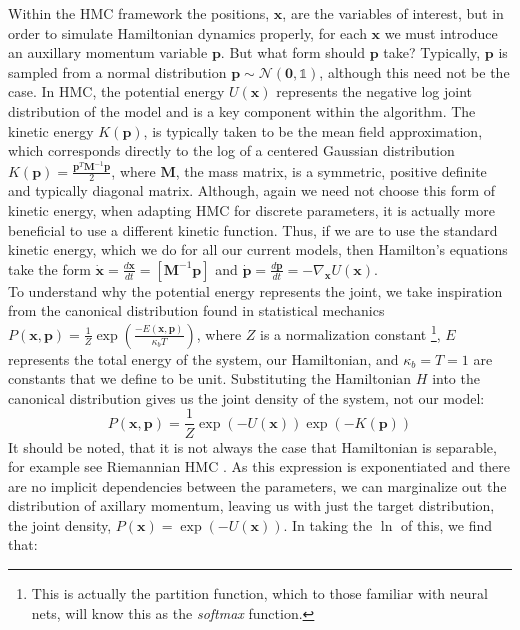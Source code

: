 Within the HMC framework the positions, $\textbf{x}$, are the variables of interest, but in order to simulate Hamiltonian dynamics properly, for each $\textbf{x}$ we must introduce an auxillary momentum variable $\textbf{p}$. But what form should $\textbf{p}$ take? Typically, $\textbf{p}$ is sampled from a normal distribution $\textbf{p} \sim \mathcal{N}(\textbf{0}, \mathds{1})$, although this need not be the case. In HMC, the potential energy $U(\textbf{x})$ represents the negative log joint distribution of the model and is a key component within the algorithm.  The kinetic energy $K(\textbf{p})$, is typically taken to be the mean field approximation, which corresponds directly to the log of a centered Gaussian distribution $K(\textbf{p}) = \frac{\textbf{p}^{T} \textbf{M}^{-1} \textbf{p}}{2}$, where $\textbf{M}$, the mass matrix, is a symmetric, positive definite and typically diagonal matrix. Although, again we need not choose this form of kinetic energy, when adapting HMC for discrete parameters, it is actually more beneficial to use a different kinetic function\citep{nishimura2017discontinuous}. Thus, if we are to use the standard kinetic energy, which we do for all our current models, then Hamilton's equations take the form $
\dot{\textbf{x}} = \frac{d\textbf{x}}{dt} = [\textbf{M}^{-1}\textbf{p}]$ and $ \dot{\textbf{p}} = \frac{d\textbf{p}}{dt} = -\nabla_{\textbf{x}}U(\textbf{x})$.\\
To understand why the potential energy represents the joint, we take inspiration from the canonical distribution found in statistical mechanics
$P(\textbf{x},\textbf{p}) = \frac{1}{Z}\exp\left(\frac{-E(\textbf{x},\textbf{p})}{\kappa_{b}T}\right)$,
where $Z$ is a normalization constant \footnote{This is actually the partition function, which to those familiar with neural nets, will know this as the \textit{softmax} function. }, $E$ represents the total energy of the system, our Hamiltonian, and $\kappa_{b} = T = 1$ are constants that we define to be unit. Substituting the Hamiltonian $H$ into the canonical distribution gives us the joint density of the system, not our model:
\begin{equation}
P(\textbf{x},\textbf{p}) = \frac{1}{Z}\exp(-U(\textbf{x}))\exp(-K(\textbf{p})) 
\end{equation}
It should be noted, that it is not always the case that Hamiltonian is separable, for example see Riemannian HMC \citep{girolami2011riemann}. As this expression is exponentiated and there are no implicit dependencies between the parameters, we can marginalize out the distribution of axillary momentum, leaving us with just the target distribution, the joint density, $P(\textbf{x})  = \exp(-U(\textbf{x}))$. In taking the $\ln$ of this, we find that:
